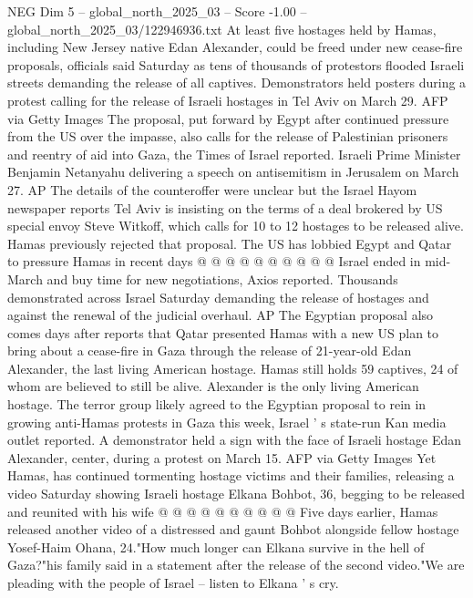 \begin{textsample}{NEG Dim 5 – global\_north\_2025\_03 – Score -1.00 – global\_north\_2025\_03/122946936.txt}  \label{ex:f5_neg_291}
At least five hostages held by Hamas, including New Jersey native Edan Alexander, could be freed under new cease-fire proposals, officials said Saturday as tens of thousands of protestors flooded Israeli streets demanding the release of all captives.
Demonstrators held posters during a protest calling for the release of Israeli hostages in Tel Aviv on March 29.
AFP via Getty Images The proposal, put forward by Egypt after continued pressure from the US over the impasse, also calls for the release of Palestinian prisoners and reentry of aid into Gaza, the Times of Israel reported.
Israeli Prime Minister Benjamin Netanyahu delivering a speech on antisemitism in Jerusalem on March 27.
AP The details of the counteroffer were unclear but the Israel Hayom newspaper reports Tel Aviv is insisting on the terms of a deal brokered by US special envoy Steve Witkoff, which calls for 10 to 12 hostages to be released alive.
Hamas previously rejected that proposal.
The US has lobbied Egypt and Qatar to pressure Hamas in recent days @ @ @ @ @ @ @ @ @ @ Israel ended in mid-March and buy time for new negotiations, Axios reported.
Thousands demonstrated across Israel Saturday demanding the release of hostages and against the renewal of the judicial overhaul.
AP The Egyptian proposal also comes days after reports that Qatar presented Hamas with a new US plan to bring about a cease-fire in Gaza through the release of 21-year-old Edan Alexander, the last living American hostage.
Hamas still holds 59 captives, 24 of whom are believed to still be alive.
Alexander is the only living American hostage.
The terror group likely agreed to the Egyptian proposal to rein in growing anti-Hamas protests in Gaza this week, Israel ' s state-run Kan media outlet reported.
A demonstrator held a sign with the face of Israeli hostage Edan Alexander, center, during a protest on March 15.
AFP via Getty Images Yet Hamas, has continued tormenting hostage victims and their families, releasing a video Saturday showing Israeli hostage Elkana Bohbot, 36, begging to be released and reunited with his wife @ @ @ @ @ @ @ @ @ @ Five days earlier, Hamas released another video of a distressed and gaunt Bohbot alongside fellow hostage Yosef-Haim Ohana, 24."How much longer can Elkana survive in the hell of Gaza?"his family said in a statement after the release of the second video."We are pleading with the people of Israel -- listen to Elkana ' s cry.

\end{textsample}
